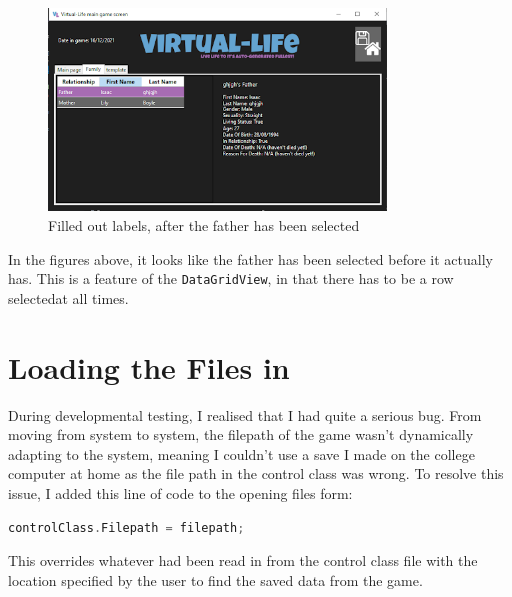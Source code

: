 \begin{figure}[H]
    \centering
    \includegraphics[width=0.8\textwidth]{images/implementation/familyTabLabelsPost.png}
    \caption{Filled out labels, after the father has been selected}
    \label{fig:implementation-familyTabLabelsPost}
\end{figure}
\noindent In the figures above, it looks like the father has been selected before it actually has. This is a feature of the \verb|DataGridView|, in that there has to be a row \textquotesingle selected\textquotesingle  at all times.

\section{Loading the Files in}
During developmental testing, I realised that I had quite a serious bug. From moving from system to system, the filepath of the game wasn't dynamically adapting to the system, meaning I couldn't use a save I made on the college computer at home as the file path in the control class was wrong. To resolve this issue, I added this line of code to the opening files form:
\begin{lstlisting}[language=c, style=csharp, caption=Line of code used to fix the filepath issues]
controlClass.Filepath = filepath;
\end{lstlisting}
This overrides whatever had been read in from the control class file with the location specified by the user to find the saved data from the game.


